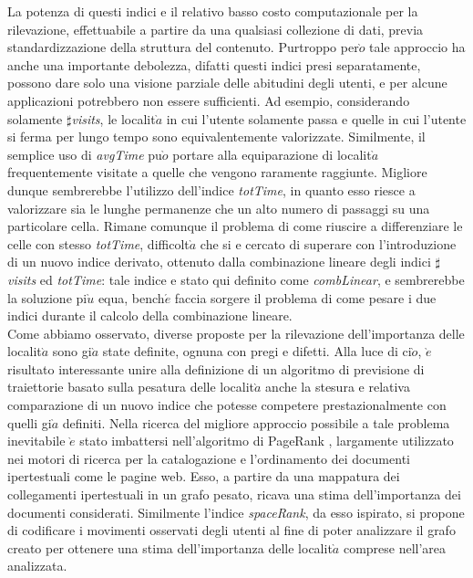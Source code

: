 La potenza di questi indici e il relativo basso costo computazionale per la rilevazione,
effettuabile a partire da una qualsiasi collezione di dati, previa standardizzazione
della struttura del contenuto. Purtroppo per$\grave{o}$ tale approccio
ha anche una importante debolezza, difatti questi indici presi separatamente,
possono dare solo una visione parziale delle abitudini degli utenti, e per alcune
applicazioni potrebbero non essere sufficienti. Ad esempio, considerando solamente
$\sharp$\textit{visits}, le localit$\grave{a}$ in cui l'utente solamente passa e quelle in cui l'utente
si ferma per lungo tempo sono equivalentemente valorizzate. Similmente, il
semplice uso di \textit{avgTime} pu$\grave{o}$ portare alla equiparazione di localit$\grave{a}$ frequentemente
visitate a quelle che vengono raramente raggiunte. Migliore dunque
sembrerebbe l'utilizzo dell'indice \textit{totTime}, in quanto esso riesce a valorizzare
sia le lunghe permanenze che un alto numero di passaggi su una particolare
cella. Rimane comunque il problema di come riuscire a differenziare le celle con
stesso \textit{totTime}, difficolt$\grave{a}$ che si e cercato di superare con l'introduzione di un
nuovo indice derivato, ottenuto dalla combinazione lineare degli indici $\sharp$\textit{visits}
ed \textit{totTime}: tale indice e stato qui definito come \textit{combLinear}, e sembrerebbe
la soluzione pi$\grave{u}$ equa, bench$\acute{e}$ faccia sorgere il problema di come pesare i due
indici durante il calcolo della combinazione lineare.\\
Come abbiamo osservato, diverse proposte per la rilevazione dell'importanza
delle localit$\grave{a}$ sono gi$\grave{a}$ state definite, ognuna con pregi e difetti. Alla
luce di ci$\grave{o}$, $\grave{e}$ risultato interessante unire alla definizione di un algoritmo di
previsione di traiettorie basato sulla pesatura delle localit$\grave{a}$ anche la stesura e
relativa comparazione di un nuovo indice che potesse competere prestazionalmente
con quelli gi$\grave{a}$ definiti. Nella ricerca del migliore approccio possibile a
tale problema inevitabile $\grave{e}$ stato imbattersi nell'algoritmo di PageRank \cite{cit_45},
largamente utilizzato nei motori di ricerca per la catalogazione e l'ordinamento
dei documenti ipertestuali come le pagine web. Esso, a partire da una
mappatura dei collegamenti ipertestuali in un grafo pesato, ricava una stima
dell'importanza dei documenti considerati. Similmente l'indice \textit{spaceRank}, da
esso ispirato, si propone di codificare i movimenti osservati degli utenti al fine
di poter analizzare il grafo creato per ottenere una stima dell'importanza delle
localit$\grave{a}$ comprese nell'area analizzata.

